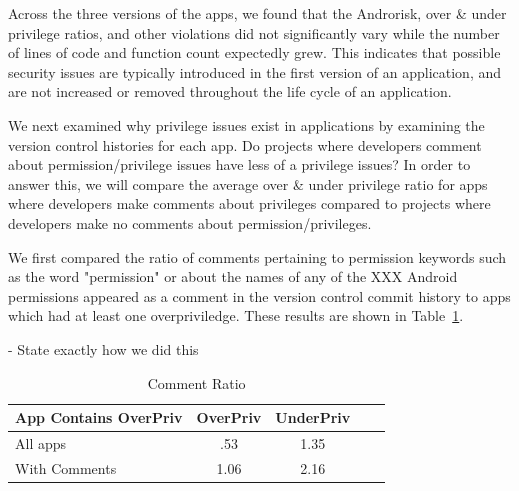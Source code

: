 \documentclass[conference]{IEEEtran}
\begin{document}
Across the three versions of the apps, we found that the Androrisk, over \& under privilege ratios, and other violations did not significantly vary while the number of lines of code and function count expectedly grew. This indicates that possible security issues are typically introduced in the first version of an application, and are not increased or removed throughout the life cycle of an application. 



We next  examined why privilege issues exist in applications by examining the version control histories for each app. 
Do projects where developers comment about permission/privilege issues have less of a privilege issues? In order to answer this, we will compare the average over \& under privilege ratio for apps where developers make comments about privileges compared to projects where developers make no comments about permission/privileges.


We first compared the ratio of comments pertaining to permission keywords such as the word "permission" or about the names of any of the XXX Android permissions appeared as a comment in the version control commit history to apps which had at least one overpriviledge. These results are shown in Table~\ref{table:commentratio}.

-	State exactly how we did this



\begin{table}[t]
\begin{center}
\caption{Comment Ratio}
\label{table:commentratio}
  \begin{tabular}{ | l | c | c | c | c |} \hline


 \bfseries App  Contains OverPriv& \bfseries OverPriv & \bfseries UnderPriv \\ \hline
 All apps & .53 & 1.35  \\ \hline
 With Comments & 1.06 & 2.16  \\ \hline

  
  \end{tabular}
  \end{center}
\end{table}
\end{document}
